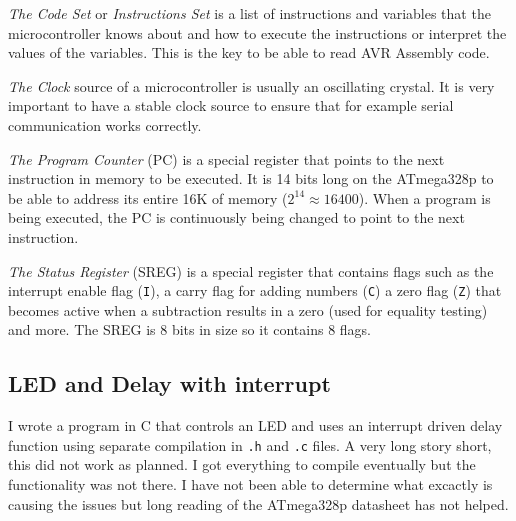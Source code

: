 \documentclass[11pt,a4paper,titlepage]{article}
\begin{document}
\textit{The Code Set} or \textit{Instructions Set} is a list of instructions and variables that the microcontroller knows about and how to execute the instructions or interpret the values of the variables. This is the key to be able to read AVR Assembly code.

\textit{The Clock} source of a microcontroller is usually an oscillating crystal. It is very important to have a stable clock source to ensure that for example serial communication works correctly.

\textit{The Program Counter} (PC) is a special register that points to the next instruction in memory to be executed. It is 14 bits long on the ATmega328p to be able to address its entire 16K of memory ($2^{14} \approx 16400$). When a program is being executed, the PC is continuously being changed to point to the next instruction.

\textit{The Status Register} (SREG) is a special register that contains flags such as the interrupt enable flag (\verb|I|), a carry flag for adding numbers (\verb|C|) a zero flag (\verb|Z|) that becomes active when a subtraction results in a zero (used for equality testing) and more. The SREG is 8 bits in size so it contains 8 flags.

\subsection{LED and Delay with interrupt}

I wrote a program in C that controls an LED and uses an interrupt driven delay function using separate compilation in \verb|.h| and \verb|.c| files. A very long story short, this did not work as planned. I got everything to compile eventually but the functionality was not there. I have not been able to determine what excactly is causing the issues but long reading of the ATmega328p datasheet has not helped.

\vspace{0.5cm}

\vspace{0.5cm}






\end{document}
